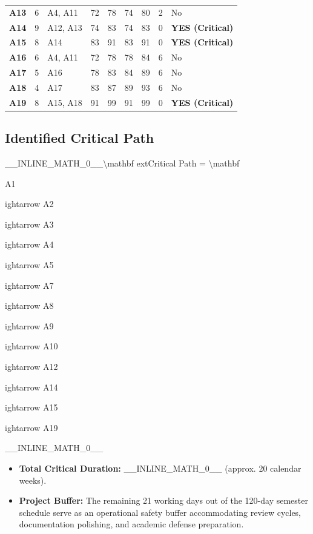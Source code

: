 \begin{table}[htbp]
{\begin{tabular}{l l l l l l l l l}
\textbf{A13} & 6 & A4, A11 & 72 & 78 & 74 & 80 & 2 & No \\
\textbf{A14} & 9 & A12, A13 & 74 & 83 & 74 & 83 & 0 & \textbf{YES (Critical)} \\
\textbf{A15} & 8 & A14 & 83 & 91 & 83 & 91 & 0 & \textbf{YES (Critical)} \\
\textbf{A16} & 6 & A4, A11 & 72 & 78 & 78 & 84 & 6 & No \\
\textbf{A17} & 5 & A16 & 78 & 83 & 84 & 89 & 6 & No \\
\textbf{A18} & 4 & A17 & 83 & 87 & 89 & 93 & 6 & No \\
\textbf{A19} & 8 & A15, A18 & 91 & 99 & 91 & 99 & 0 & \textbf{YES (Critical)} \\
\bottomrule
\end{tabular}%
}
\end{table}

\subsection{Identified Critical Path}

\_\_INLINE\_MATH\_0\_\_\textbackslash{}mathbf{	ext{Critical Path}} = \textbackslash{}mathbf{A1

ightarrow A2

ightarrow A3

ightarrow A4

ightarrow A5

ightarrow A7

ightarrow A8

ightarrow A9

ightarrow A10

ightarrow A12

ightarrow A14

ightarrow A15

ightarrow A19}\_\_INLINE\_MATH\_0\_\_

\begin{itemize}
  \item \textbf{Total Critical Duration:} \_\_INLINE\_MATH\_0\_\_ (approx. 20 calendar weeks).
  \item \textbf{Project Buffer:} The remaining 21 working days out of the 120-day semester schedule serve as an operational safety buffer accommodating review cycles, documentation polishing, and academic defense preparation.
\end{itemize}
